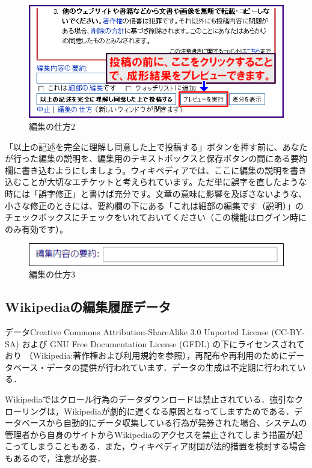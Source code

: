 \begin{figure}[htb]
\centering
\includegraphics[width=13cm]{sample2.png}
\caption{編集の仕方2}\label{サンプル図}
\end{figure}

「以上の記述を完全に理解し同意した上で投稿する」ボタンを押す前に、あなたが行った編集の説明を、編集用のテキストボックスと保存ボタンの間にある要約欄に書き込むようにしましょう。ウィキペディアでは、ここに編集の説明を書き込むことが大切なエチケットと考えられています。ただ単に誤字を直したような時には「誤字修正」と書けば充分です。文章の意味に影響を及ぼさないような、小さな修正のときには、要約欄の下にある「これは細部の編集です（説明）」のチェックボックスにチェックをいれておいてください（この機能はログイン時にのみ有効です）。\cite{wikiEdit}

\begin{figure}[htb]
\centering
\includegraphics[width=13cm]{sample3.png}
\caption{編集の仕方3}\label{サンプル図}
\end{figure}

\subsection{Wikipediaの編集履歴データ}

データCreative Commons Attribution-ShareAlike 3.0 Unported License (CC-BY-SA) および GNU Free Documentation License (GFDL) の下にライセンスされており （Wikipedia:著作権および利用規約を参照），再配布や再利用のためにデータベース・データの提供が行われています．データの生成は不定期に行われている．

Wikipediaではクロール行為のデータダウンロードは禁止されている．強引なクローリングは，Wikipediaが劇的に遅くなる原因となってしますためである．データベースから自動的にデータ収集している行為が発券された場合、システムの管理者から自身のサイトからWikipediaのアクセスを禁止されてしまう措置が起こってしまうこともある．また，ウィキペディア財団が法的措置を検討する場合もあるので，注意が必要．


